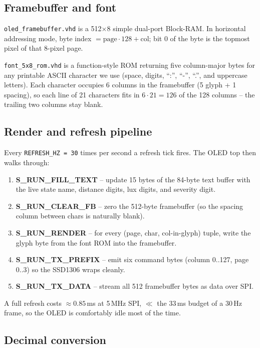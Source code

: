 \documentclass[11pt,a4paper]{article}
\begin{document}
\subsection{Framebuffer and font}

\texttt{oled\_framebuffer.vhd} is a 512$\times$8 simple dual-port
Block-RAM.  In horizontal addressing mode, byte index $= \text{page}\cdot
128 + \text{col}$; bit 0 of the byte is the topmost pixel of that
8-pixel page.

\texttt{font\_5x8\_rom.vhd} is a function-style ROM returning five
column-major bytes for any printable ASCII character we use
(space, digits, ``:'', ``-'', ``.'', and uppercase letters).  Each
character occupies 6 columns in the framebuffer (5 glyph + 1 spacing),
so each line of 21 characters fits in $6 \cdot 21 = 126$ of the 128
columns -- the trailing two columns stay blank.

\subsection{Render and refresh pipeline}

Every \texttt{REFRESH\_HZ = 30} times per second a refresh tick fires.
The OLED top then walks through:

\begin{enumerate}
  \item \textbf{S\_RUN\_FILL\_TEXT} -- update 15 bytes of the 84-byte
        text buffer with the live state name, distance digits,
        lux digits, and severity digit.
  \item \textbf{S\_RUN\_CLEAR\_FB} -- zero the 512-byte framebuffer
        (so the spacing column between chars is naturally blank).
  \item \textbf{S\_RUN\_RENDER} -- for every (page, char, col-in-glyph)
        tuple, write the glyph byte from the font ROM into the
        framebuffer.
  \item \textbf{S\_RUN\_TX\_PREFIX} -- emit six command bytes
        (column 0..127, page 0..3) so the SSD1306 wraps cleanly.
  \item \textbf{S\_RUN\_TX\_DATA} -- stream all 512 framebuffer bytes
        as data over SPI.
\end{enumerate}

A full refresh costs $\approx 0.85$\,ms at 5\,MHz SPI, $\ll$ the 33\,ms
budget of a 30\,Hz frame, so the OLED is comfortably idle most of the
time.

\subsection{Decimal conversion}
\end{document}
